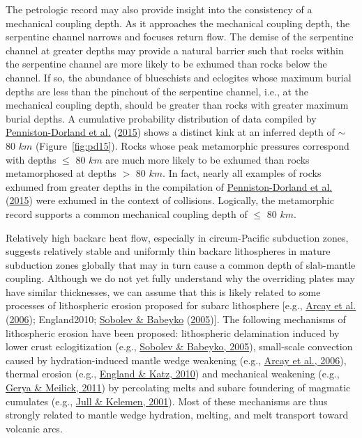 \documentclass[draft,linenumbers]{agujournal2018}
\begin{document}
The petrologic record may also provide insight into the consistency of a
mechanical coupling depth. As it approaches the mechanical coupling
depth, the serpentine channel narrows and focuses return flow. The
demise of the serpentine channel at greater depths may provide a natural
barrier such that rocks within the serpentine channel are more likely to
be exhumed than rocks below the channel. If so, the abundance of
blueschists and eclogites whose maximum burial depths are less than the
pinchout of the serpentine channel, i.e., at the mechanical coupling
depth, should be greater than rocks with greater maximum burial depths.
A cumulative probability distribution of data compiled by
\protect\hyperlink{ref-Penniston2015}{Penniston-Dorland et al.}
(\protect\hyperlink{ref-Penniston2015}{2015}) shows a distinct kink at
an inferred depth of \(\sim\) 80 \(km\) (Figure~\ref{fig:pd15}). Rocks
whose peak metamorphic pressures correspond with depths \(\leq\) 80
\(km\) are much more likely to be exhumed than rocks metamorphosed at
depths \(>\) 80 \(km\). In fact, nearly all examples of rocks exhumed
from greater depths in the compilation of
\protect\hyperlink{ref-Penniston2015}{Penniston-Dorland et al.}
(\protect\hyperlink{ref-Penniston2015}{2015}) were exhumed in the
context of collisions. Logically, the metamorphic record supports a
common mechanical coupling depth of \(\leq\) 80 \(km\).

Relatively high backarc heat flow, especially in circum-Pacific
subduction zones, suggests relatively stable and uniformly thin backarc
lithospheres in mature subduction zones globally that may in turn cause
a common depth of slab-mantle coupling. Although we do not yet fully
understand why the overriding plates may have similar thicknesses, we
can assume that this is likely related to some processes of lithospheric
erosion proposed for subarc lithosphere {[}e.g.,
\protect\hyperlink{ref-Arcay2006}{Arcay et al.}
(\protect\hyperlink{ref-Arcay2006}{2006}); England2010;
\protect\hyperlink{ref-Sobolev2005}{Sobolev \& Babeyko}
(\protect\hyperlink{ref-Sobolev2005}{2005}){]}. The following mechanisms
of lithospheric erosion have been proposed: lithospheric delamination
induced by lower crust eclogitization (e.g.,
\protect\hyperlink{ref-Sobolev2005}{Sobolev \& Babeyko, 2005}),
small-scale convection caused by hydration-induced mantle wedge
weakening (e.g., \protect\hyperlink{ref-Arcay2006}{Arcay et al., 2006}),
thermal erosion (e.g., \protect\hyperlink{ref-England2010}{England \&
Katz, 2010}) and mechanical weakening (e.g.,
\protect\hyperlink{ref-Gerya2011}{Gerya \& Meilick, 2011}) by
percolating melts and subarc foundering of magmatic cumulates (e.g.,
\protect\hyperlink{ref-Jull2001}{Jull \& Kelemen, 2001}). Most of these
mechanisms are thus strongly related to mantle wedge hydration, melting,
and melt transport toward volcanic arcs.
\end{document}
